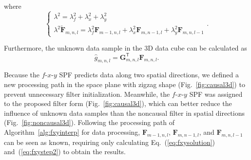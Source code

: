 where
\begin{equation}
    \begin{cases}
        \lambda^{2} = \lambda_{f}^{2}+\lambda_{x}^{2}+\lambda_{y}^{2} \\
        \lambda^{2} \mathbf{\tilde{F}}_{m,n,l}
        = \lambda_{f}^{2} \mathbf{F}_{m-1,n,l}
        + \lambda_{x}^{2} \mathbf{F}_{m,n-1,l}
        + \lambda_{y}^{2} \mathbf{F}_{m,n,l-1}
    \end{cases}.
\end{equation}

Furthermore, the unknown data sample in the 3D data cube can
be calculated as
\begin{equation}
    \label{eq:fxystep2}
    \hat{g}_{m,n,l} = \mathbf{G}_{m,n,l}^{\mathsf{T}} \mathbf{F}_{m,n,l}.
\end{equation}

Because the $f$-$x$-$y$ SPF predicts data along two spatial
directions, we defined a new processing path in the space plane with
zigzag shape (Fig.~\ref{fig:causal3d}) to prevent unnecessary filter
initialization. Meanwhile, the $f$-$x$-$y$ SPF was assigned to the
proposed filter form (Fig.~\ref{fig:causal3d}), which can better
reduce the influence of unknown data samples than the noncausal filter
in spatial directions (Fig.~\ref{fig:noncausal3d}).  Following the
processing path of Algorithm~\ref{alg:fxyinterp} for data processing,
$\mathbf{F}_{m-1,n,l}$, $\mathbf{F}_{m,n-1,l}$, and
$\mathbf{F}_{m,n,l-1}$ can be seen as known, requiring only
calculating Eq.~(\ref{eq:fxysolution}) and~(\ref{eq:fxystep2}) to
obtain the results.

